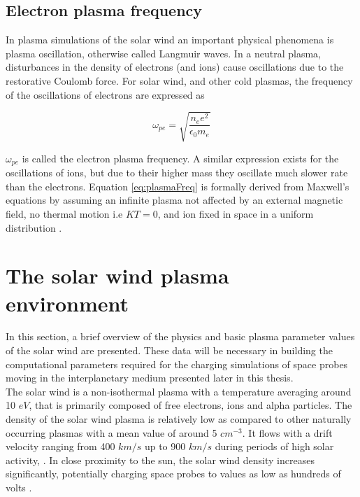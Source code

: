 \subsection{Electron plasma frequency}
In plasma simulations of the solar wind an important physical phenomena is plasma oscillation, otherwise called Langmuir waves. In a neutral plasma, disturbances in the density of electrons (and ions) cause oscillations due to the restorative Coulomb force. For solar wind, and other cold plasmas, the frequency of the oscillations of electrons are expressed as

\begin{equation}\label{eq:plasmaFreq}
    \omega_{pe} = \sqrt{\frac{n_e e^2}{\epsilon_0 m_e}}
\end{equation}

$\omega_{pe}$ is called the electron plasma frequency. A similar expression exists for the oscillations of ions, but due to their higher mass they oscillate much slower rate than the electrons. Equation \ref{eq:plasmaFreq} is formally derived from Maxwell's equations  by assuming an infinite plasma not affected by an external magnetic field, no thermal motion i.e $KT = 0$, and ion fixed in space  in a uniform distribution .



\section{The solar wind plasma environment}
In this section, a brief overview of the physics and basic plasma parameter values of the solar wind are presented. These data will be necessary in building the computational parameters required for the charging simulations of space probes moving in the interplanetary medium presented later in this thesis.
\\
The solar wind is a non-isothermal plasma with a temperature averaging around 10 $eV$, that is primarily composed of free electrons, ions and alpha particles. The density of the solar wind plasma is relatively low as compared to other naturally occurring plasmas with a mean value of around 5 $cm^{-3}$. It flows with a drift velocity ranging from 400 $km/s$ up to 900 $km/s$ during periods of high solar activity, . In close proximity to the sun, the solar wind density increases significantly, potentially charging space probes to values as low as hundreds of volts .


